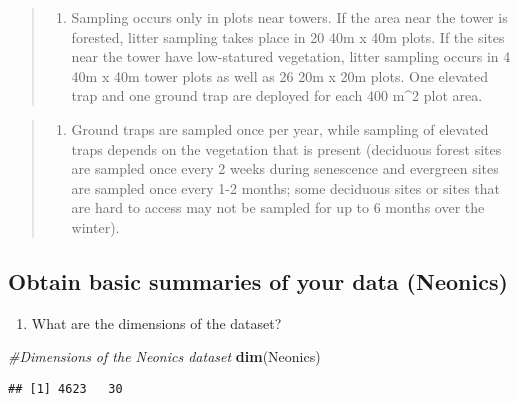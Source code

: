 \documentclass[]{article}
\newenvironment{Shaded}{\begin{snugshade}}{\end{snugshade}}
\newcommand{\CommentTok}[1]{\textcolor[rgb]{0.56,0.35,0.01}{\textit{#1}}}
\newcommand{\KeywordTok}[1]{\textcolor[rgb]{0.13,0.29,0.53}{\textbf{#1}}}
\newcommand{\NormalTok}[1]{#1}
\providecommand{\tightlist}{%
  \setlength{\itemsep}{0pt}\setlength{\parskip}{0pt}}
\begin{document}
\begin{quote}
\begin{enumerate}
\def\labelenumi{\arabic{enumi}.}
\setcounter{enumi}{1}
\tightlist
\item
  Sampling occurs only in plots near towers. If the area near the tower
  is forested, litter sampling takes place in 20 40m x 40m plots. If the
  sites near the tower have low-statured vegetation, litter sampling
  occurs in 4 40m x 40m tower plots as well as 26 20m x 20m plots. One
  elevated trap and one ground trap are deployed for each 400 m\^{}2
  plot area.
\end{enumerate}
\end{quote}

\begin{quote}
\begin{enumerate}
\def\labelenumi{\arabic{enumi}.}
\setcounter{enumi}{2}
\tightlist
\item
  Ground traps are sampled once per year, while sampling of elevated
  traps depends on the vegetation that is present (deciduous forest
  sites are sampled once every 2 weeks during senescence and evergreen
  sites are sampled once every 1-2 months; some deciduous sites or sites
  that are hard to access may not be sampled for up to 6 months over the
  winter).
\end{enumerate}
\end{quote}

\hypertarget{obtain-basic-summaries-of-your-data-neonics}{%
\subsection{Obtain basic summaries of your data
(Neonics)}\label{obtain-basic-summaries-of-your-data-neonics}}

\begin{enumerate}
\def\labelenumi{\arabic{enumi}.}
\setcounter{enumi}{4}
\tightlist
\item
  What are the dimensions of the dataset?
\end{enumerate}

\begin{Shaded}
\begin{Highlighting}[]
\CommentTok{#Dimensions of the Neonics dataset}
\KeywordTok{dim}\NormalTok{(Neonics)}
\end{Highlighting}
\end{Shaded}

\begin{verbatim}
## [1] 4623   30
\end{verbatim}
\end{document}
